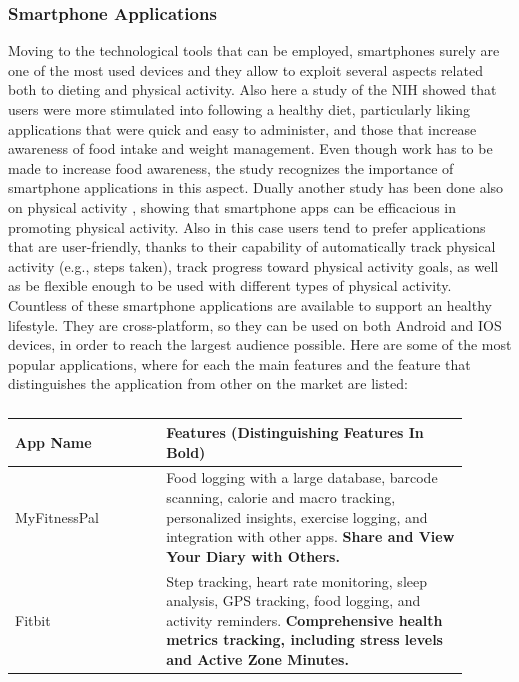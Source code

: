\subsubsection{Smartphone Applications} %
Moving to the technological tools that can be employed, smartphones surely are one of the most used devices and they allow to exploit several aspects related both to dieting and physical activity. Also here a study of the NIH \cite{NihSmartphoneDieting} showed that users were more stimulated into following a healthy diet, particularly liking applications that were quick and easy to administer, and those that increase awareness of food intake and weight management. Even though work has to be made to increase food awareness, the study recognizes the importance of smartphone applications in this aspect. Dually another study has been done also on physical activity \cite{NihSmartphonePhysicalActivity}, showing that smartphone apps can be efficacious in promoting physical activity. Also in this case users tend to prefer applications that are user-friendly, thanks to their capability of automatically track physical activity (e.g., steps taken), track progress toward physical activity goals, as well as be flexible enough to be used with different types of physical activity. Countless of these smartphone applications are available to support an healthy lifestyle. They are cross-platform, so they can be used on both Android and IOS devices, in order to reach the largest audience possible. Here are some of the most popular applications, where for each the main features and the feature that distinguishes the application from other on the market are listed:
\begin{table}[h!]
    \captionsetup{labelformat=empty}
    \setstretch{\myspacing}
    \centering
    \begin{tabular}{|>{\raggedright\arraybackslash}p{0.3\linewidth}|>{\raggedright\arraybackslash}p{0.6\linewidth}|}
        \hline
        \textbf{App Name} & \textbf{Features (Distinguishing Features In Bold)}                                                                                                                                                                                              \\
        \hline
        MyFitnessPal      & Food logging with a large database, barcode scanning, calorie and macro tracking, personalized insights, exercise logging, and integration with other apps. \textbf{Share and View Your Diary with Others.} \\
        \hline
        Fitbit            & Step tracking, heart rate monitoring, sleep analysis, GPS tracking, food logging, and activity reminders. \textbf{Comprehensive health metrics tracking, including stress levels and Active Zone Minutes.}                                       \\
        \hline
    \end{tabular}
    \caption{}
    \label{popularApps}
\end{table}

